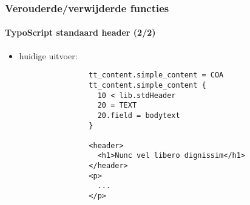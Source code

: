
\begin{frame}[fragile]
	\frametitle{Verouderde/verwijderde functies}
	\framesubtitle{TypoScript standaard header (2/2)}

	\lstset{basicstyle=\tiny\ttfamily}

	\begin{itemize}

		\item huidige uitvoer:

			\begin{lstlisting}
				tt_content.simple_content = COA
				tt_content.simple_content {
				  10 < lib.stdHeader
				  20 = TEXT
				  20.field = bodytext
				}

				<header>
				  <h1>Nunc vel libero dignissim</h1>
				</header>
				<p>
				  ...
				</p>
			\end{lstlisting}

	\end{itemize}

\end{frame}


